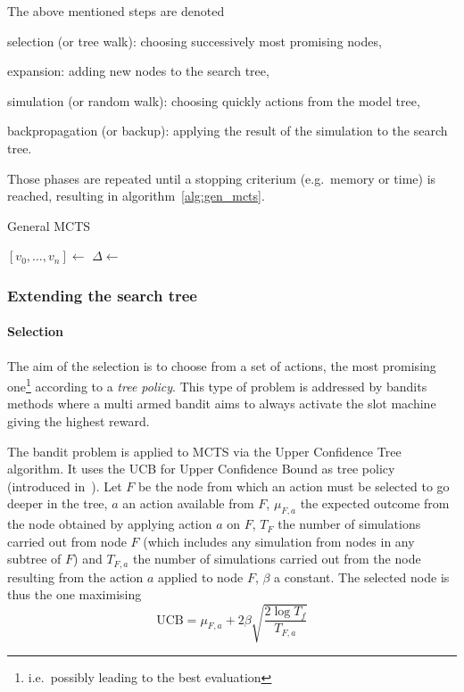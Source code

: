 \documentclass[twoside,twocolumn]{article}
\begin{document}
The above mentioned steps are denoted
\begin{compactenum}
  \item selection (or tree walk): choosing successively most promising nodes,
  \item expansion: adding new nodes to the search tree,
  \item simulation (or random walk): choosing quickly actions from the model
    tree,
  \item backpropagation (or backup): applying the result of the simulation to
    the search tree.
\end{compactenum}
Those phases are repeated until a stopping criterium (e.g.\ memory or time) is
reached, resulting in algorithm~\ref{alg:gen_mcts}.
\begin{algorithm}
  \caption{General MCTS~\cite{browne2012survey}}\label{alg:gen_mcts}
  \begin{algorithmic}
    \State{} \([v_0, \dots, v_n] \gets\) 
    \State{} \(\Delta \gets\) 
    \State{} 
    \EndWhile{}
    \EndProcedure{}
  \end{algorithmic}
\end{algorithm}

\subsubsection{Extending the search tree}
\paragraph{Selection}
The aim of the selection is to choose from a set of actions, the most promising
one\footnote{i.e.\ possibly leading to the best evaluation} according to a
\emph{tree policy}. This type of problem is addressed by bandits methods where
a multi armed bandit aims to always activate the slot machine giving the highest
reward.

The bandit problem is applied to MCTS via the Upper Confidence Tree algorithm.
It uses the UCB for Upper Confidence Bound as tree policy (introduced
in~\cite{kocsis2006bandit}). Let \(F\) be the node from which an action must be
selected to go deeper in the tree, \(a\) an action available from \(F\),
\(\mu_{F,a}\) the expected outcome from the node obtained by applying action
\(a\) on \(F\), \(T_F\) the number of simulations carried out from node \(F\)
(which includes any simulation from nodes in any subtree of \(F\)) and
\(T_{F,a}\) the number of simulations carried out from the node resulting from
the action \(a\) applied to node \(F\), \(\beta\) a constant. The selected node
is thus the one maximising
\begin{equation}
  \text{UCB} = \mu_{F,a} + 2 \beta \sqrt{\frac{2 \log T_f}{T_{F,a}}}
\end{equation}
\end{document}
